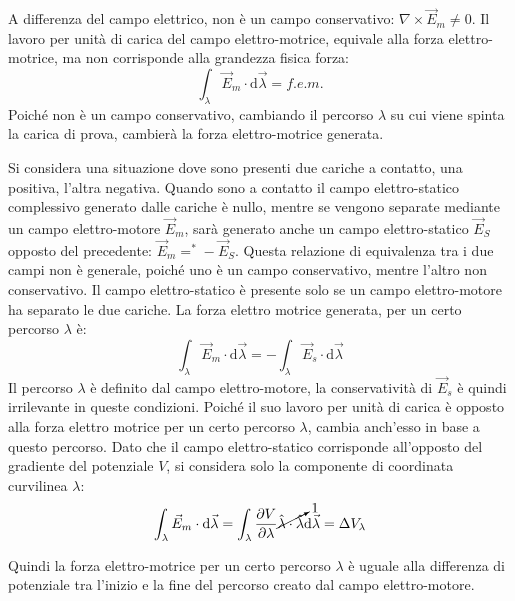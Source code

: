 \documentclass{article}
\newcommand{\df}{\mathrm{d}}
\numberwithin{equation}{subsection}
\begin{document}
A differenza del campo elettrico, non è un campo conservativo: $\nabla\times\vec{E}_m\neq0$. Il lavoro per unità di carica del campo elettro-motrice, equivale alla 
forza elettro-motrice, ma non corrisponde alla grandezza fisica forza:
\begin{equation*}
    \displaystyle\int_{\lambda}\vec{E}_m\cdot \df\vec{\lambda}=f.e.m.
\end{equation*}
Poiché non è un campo conservativo, cambiando il percorso $\lambda$ su cui viene spinta la carica di prova, cambierà la forza elettro-motrice generata. 



Si considera una situazione dove sono presenti due cariche a contatto, una positiva, l'altra negativa. Quando sono a contatto il campo elettro-statico complessivo generato 
dalle cariche è nullo, mentre se vengono separate mediante un campo elettro-motore $\vec{E}_m$, sarà generato anche un campo elettro-statico $\vec{E}_S$ opposto del precedente: 
$\vec{E}_m=^*-\vec{E}_S$. Questa relazione di equivalenza tra i due campi non è generale, poiché uno è un campo conservativo, mentre l'altro non conservativo. Il campo 
elettro-statico è presente solo se un campo elettro-motore ha separato le due cariche. 
La forza elettro motrice generata, per un certo percorso $\lambda$ è:
\begin{equation*}
    \displaystyle\int_{\lambda}\vec{E}_m\cdot \df\vec{\lambda}=-\int_{\lambda}\vec{E}_s\cdot \df\vec{\lambda}
\end{equation*}
Il percorso $\lambda$ è definito dal campo elettro-motore, la conservatività di $\vec{E}_s$ è quindi irrilevante in queste condizioni. Poiché il suo lavoro per unità di carica 
è opposto alla forza elettro motrice per un certo percorso $\lambda$, cambia anch'esso in base a questo percorso. Dato che il campo elettro-statico corrisponde all'opposto del 
gradiente del potenziale $V$, si considera solo la componente di coordinata curvilinea $\lambda$: 
\begin{equation*}
    \displaystyle\int_{\lambda}\vec{E}_m\cdot \df\vec{\lambda}=\int_{\lambda}\frac{\partial V}{\partial\lambda}\cancelto{1}{\hat{\lambda}\cdot\hat{\lambda}}\df\vec{\lambda}=\Delta V_{\lambda}
\end{equation*}

Quindi la forza elettro-motrice per un certo percorso $\lambda$ è uguale alla differenza di potenziale tra l'inizio e la fine del percorso creato dal campo elettro-motore. 
 
\end{document}
